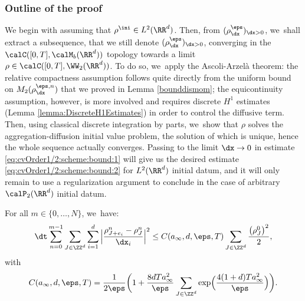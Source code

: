 \subsubsection*{Outline of the proof}
We begin with assuming that $\rho^{\ini} \in L^2(\RR^d)$. Then, from $(\rho_{\dx}^\eps)_{\dx > 0}$, we~shall extract a subsequence, that we still denote $(\rho_{\dx}^\eps)_{\dx > 0}$, converging in the $\calC([0,T], \calM_b(\RR^d))$ topology towards a limit $\rho \in \calC([0,T], \WW_2(\RR^d))$. To do so, we~apply the Ascoli-Arzelà theorem: the relative compactness assumption follows quite directly from the uniform bound on $M_2(\rho_{\dx}^{\eps,n})$ that we proved in Lemma \ref{bounddismom}; the equicontinuity assumption, however, is more involved and requires discrete $H^1$ estimates (Lemma \ref{lemma:DiscreteH1Estimates}) in order to control the diffusive term. Then, using classical discrete integration by parts, we~show that $\rho$ solves the aggregation-diffusion initial value problem, the solution of which is unique, hence the whole sequence actually converges. Passing to the limit $\dx \to 0$ in estimate \eqref{eq:cvOrder1/2:scheme:bound:1} will give us the desired estimate \eqref{eq:cvOrder1/2:scheme:bound:2} for $L^2(\RR^d)$ initial datum, and it will only remain to use a regularization argument to conclude in the case of arbitrary $\calP_2(\RR^d)$ initial datum.
\begin{lemma}\label{lemma:DiscreteH1Estimates}
For all $m \in \{0, \ldots, N\}$, we~have:
\[
\dt\sum_{n=0}^{m-1} \sum_{J \in \ZZ^d} \sum_{i=1}^d \Big|\frac{\rho_{J+e_i}^n - \rho_J^n}{\dx_i}\Big|^2 \leq C(a_\infty, d, \eps,T) \sum_{J\in\ZZ^d} \frac{\big(\rho_J^0\big)^2}{2},
\]
with
\[
C(a_\infty, d, \eps,T) =
\frac{1}{2 \eps}\biggl(1 + \frac{8dT a_\infty^2}{\eps} \sum_{J\in\ZZ^d}
\exp\Bigl(\frac{4(1 + d)T a_\infty^2}{\eps}\Bigr)\biggr).
\]
\end{lemma}
